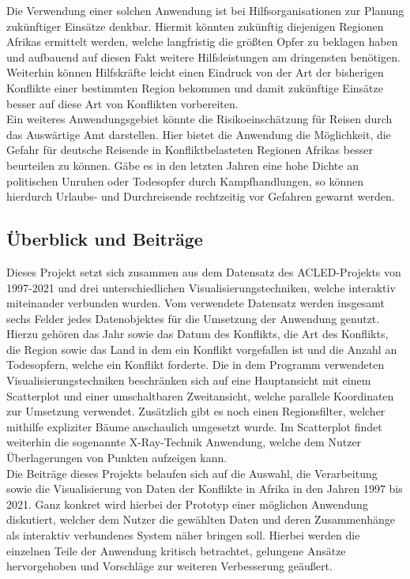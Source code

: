 \documentclass[usegeometry=true]{scrartcl}
\begin{document}
Die Verwendung einer solchen Anwendung ist bei Hilfsorganisationen zur Planung zukünftiger Einsätze denkbar. Hiermit könnten zukünftig diejenigen Regionen Afrikas ermittelt werden, welche langfristig die größten Opfer zu beklagen haben und aufbauend auf diesen Fakt weitere Hilfsleistungen am dringensten benötigen. Weiterhin können Hilfskräfte leicht einen Eindruck von der Art der bisherigen Konflikte einer bestimmten Region bekommen und damit zukünftige Einsätze besser auf diese Art von Konflikten vorbereiten.\\

Ein weiteres Anwendungsgebiet könnte die Risikoeinschätzung für Reisen durch das Auswärtige Amt \citep{aa} darstellen. Hier bietet die Anwendung die Möglichkeit, die Gefahr für deutsche Reisende in Konfliktbelasteten Regionen Afrikas besser beurteilen zu können. Gäbe es in den letzten Jahren eine hohe Dichte an politischen Unruhen oder Todesopfer durch Kampfhandlungen, so können hierdurch Urlaubs- und Durchreisende rechtzeitig vor Gefahren gewarnt werden.

\subsection{Überblick und Beiträge}
Dieses Projekt setzt sich zusammen aus dem Datensatz des ACLED-Projekts von 1997-2021 und drei unterschiedlichen Visualisierungstechniken, welche interaktiv miteinander verbunden wurden. Vom verwendete Datensatz werden insgesamt sechs Felder jedes Datenobjektes für die Umsetzung der Anwendung genutzt. Hierzu gehören das Jahr sowie das Datum des Konflikts, die Art des Konflikts, die Region sowie das Land in dem ein Konflikt vorgefallen ist und die Anzahl an Todesopfern, welche ein Konflikt forderte. Die in dem Programm verwendeten Visualisierungstechniken beschränken sich auf eine Hauptansicht mit einem Scatterplot und einer umschaltbaren Zweitansicht, welche parallele Koordinaten zur Umsetzung verwendet. Zusätzlich gibt es noch einen Regionsfilter, welcher mithilfe expliziter Bäume anschaulich umgesetzt wurde. Im Scatterplot findet weiterhin die sogenannte X-Ray-Technik Anwendung, welche dem Nutzer Überlagerungen von Punkten aufzeigen kann. \\

Die Beiträge dieses Projekts belaufen sich auf die Auswahl, die Verarbeitung sowie die Visualisierung von Daten der Konflikte in Afrika in den Jahren 1997 bis 2021. Ganz konkret wird hierbei der Prototyp einer möglichen Anwendung diskutiert, welcher dem Nutzer die gewählten Daten und deren Zusammenhänge als interaktiv verbundenes System näher bringen soll. Hierbei werden die einzelnen Teile der Anwendung kritisch betrachtet, gelungene Ansätze hervorgehoben und Vorschläge zur weiteren Verbesserung geäußert.
\end{document}
